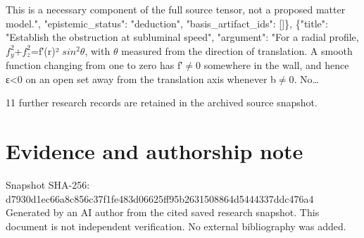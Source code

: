 \documentclass[11pt]{article}
\begin{document}
This is a necessary component of the full source tensor, not a proposed matter model.", "epistemic\_status": "deduction", "basis\_artifact\_ids": []\}, \{"title": "Establish the obstruction at subluminal speed", "argument": "For a radial profile, $f_y^{2}$+$f_z^{2}$=f′(r)² $sin^{2}$$\theta$, with $\theta$ measured from the direction of translation. A smooth function changing from one to zero has f′$\neq$0 somewhere in the wall, and hence ε\textless{}0 on an open set away from the translation axis whenever b$\neq$0. No…

11 further research records are retained in the archived source snapshot.
\section*{Evidence and authorship note}
Snapshot SHA-256: d7930d1ec66a8c856c37f1fe483d06625ff95b2631508864d5444337ddc476a4
Generated by an AI author from the cited saved research snapshot. This document is not independent verification. No external bibliography was added.
\end{document}
